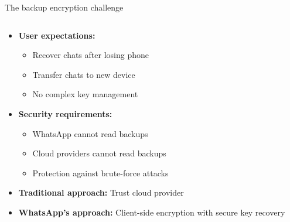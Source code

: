 \documentclass[aspectratio=169, lualatex, handout]{beamer}
\begin{document}
\begin{frame}{The backup encryption challenge}
	\begin{columns}[c]
		\begin{column}{1\textwidth}
			\begin{itemize}
				\item \textbf{User expectations:}
				      \begin{itemize}
					      \item Recover chats after losing phone
					      \item Transfer chats to new device
					      \item No complex key management
				      \end{itemize}
				\item \textbf{Security requirements:}
				      \begin{itemize}
					      \item WhatsApp cannot read backups
					      \item Cloud providers cannot read backups
					      \item Protection against brute-force attacks
				      \end{itemize}
				\item \textbf{Traditional approach:} Trust cloud provider
				\item \textbf{WhatsApp's approach:} Client-side encryption with secure key recovery
			\end{itemize}
		\end{column}
	\end{columns}
\end{frame}
\end{document}
